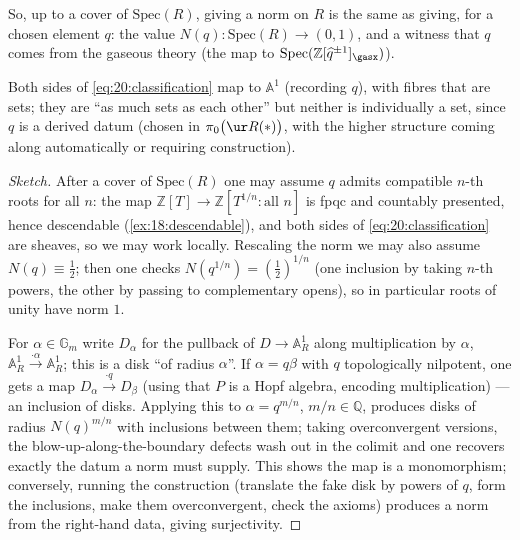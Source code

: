 So, up to a cover of $\mathrm{Spec}(R)$, giving a norm on $R$ is the same as
giving, for a chosen element $q$: the value $N(q)\colon\mathrm{Spec}(R)\to(0,1)$,
and a witness that $q$ comes from the gaseous theory (the map to
$\mathrm{Spec}(\mathbb Z[\widehat q^{\pm1}]_\gasx)$).

\begin{remark}
\label{rmk:20:relative-sets}
Both sides of \eqref{eq:20:classification} map to $\mathbb A^1$ (recording $q$),
with fibres that are sets; they are ``as much sets as each other'' but neither is
individually a set, since $q$ is a derived datum (chosen in $\pi_0\bigl(\ur R
(\ast)\bigr)$, with the higher structure coming along automatically or
requiring construction).
\end{remark}

\begin{proof}[Sketch]
After a cover of $\mathrm{Spec}(R)$ one may assume $q$ admits compatible $n$-th
roots for all $n$: the map $\mathbb Z[T]\to\mathbb Z[T^{1/n}:\text{all }n]$ is
fpqc and countably presented, hence descendable (\cref{ex:18:descendable}), and
both sides of \eqref{eq:20:classification} are sheaves, so we may work locally.
Rescaling the norm we may also assume $N(q)\equiv\tfrac12$; then one checks
$N(q^{1/n})=(\tfrac12)^{1/n}$ (one inclusion by taking $n$-th powers, the other by
passing to complementary opens), so in particular roots of unity have norm $1$.

For $\alpha\in\mathbb G_m$ write $D_\alpha$ for the pullback of $D\to
\mathbb A^1_R$ along multiplication by $\alpha$, $\mathbb A^1_R\xrightarrow{\cdot
\alpha}\mathbb A^1_R$; this is a disk ``of radius $\alpha$''. If $\alpha=q\beta$
with $q$ topologically nilpotent, one gets a map $D_\alpha\xrightarrow{\cdot q}
D_\beta$ (using that $P$ is a Hopf algebra, encoding multiplication) --- an
inclusion of disks. Applying this to $\alpha=q^{m/n}$, $m/n\in\mathbb Q$, produces
disks of radius $N(q)^{m/n}$ with inclusions between them; taking overconvergent
versions, the blow-up-along-the-boundary defects wash out in the colimit and one
recovers exactly the datum a norm must supply. This shows the map is a
monomorphism; conversely, running the construction (translate the fake disk by
powers of $q$, form the inclusions, make them overconvergent, check the axioms)
produces a norm from the right-hand data, giving surjectivity.
\end{proof}

